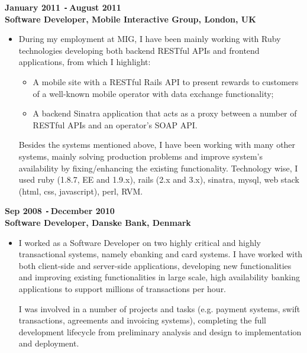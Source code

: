 \documentclass{res}
\def\Minus{\texttt{-}\,}
\begin{document}
\begin{resume}
\begin{itemize}
      \end{itemize}
  {\bf January 2011 \Minus August 2011}\\
  {\bf Software Developer, Mobile Interactive Group, London, UK}
       \begin{itemize}
        \item[] During my employment at MIG, I have been mainly working with Ruby technologies developing both backend RESTful APIs and frontend applications, from which I highlight:
          \begin{itemize}
          \item A mobile site with a RESTful Rails API to present rewards to customers of a well-known mobile operator with data exchange functionality;
          \item A backend Sinatra application that acts as a proxy between a number of RESTful APIs and an operator’s SOAP API.
          \end{itemize}

        Besides the systems mentioned above, I have been working with many other systems, mainly solving production problems and improve system’s availability by fixing/enhancing the existing functionality. Technology wise, I used ruby (1.8.7, EE and 1.9.x), rails (2.x and 3.x), sinatra, mysql, web stack (html, css, javascript), perl, RVM.
    \end{itemize}

  {\bf Sep 2008 \Minus December 2010}\\
  {\bf Software Developer, Danske Bank, Denmark}
        \begin{itemize}
        \item[] I worked as a Software Developer on two highly critical and highly transactional systems, namely ebanking and card systems. I have worked with both client-side and server-side applications, developing new functionalities and improving existing functionalities in large scale, high availability banking applications to support millions of transactions per hour.

        I was involved in a number of projects and tasks (e.g. payment systems, swift transactions, agreements and invoicing systems), completing the full development lifecycle from preliminary analysis and design to implementation and deployment.
       \end{itemize}


\end{resume}
\end{document}
